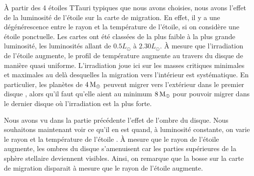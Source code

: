 À partir des 4 étoiles TTauri typiques que nous avons choisies, nous avons l'effet de la luminosité de l'étoile sur la carte de migration. En effet, il y a une dégénérescence entre le rayon et la température de l'étoile, si on considère une étoile ponctuelle. Les cartes ont été classées de la plus faible à la plus grande luminosité, les luminosités allant de $0.5\unit{L_\odot}$ à $2.30\unit{L_\odot}$. À mesure que l'irradiation de l'étoile augmente, le profil de température augmente au travers du disque de manière quasi uniforme. L'irradiation joue ici sur les masses critiques minimales et maximales au delà desquelles la migration vers l'intérieur est systématique. En particulier, les planètes de $4\mathrm{\thinspace M_\oplus}$ peuvent migrer vers l'extérieur dans le premier disque , alors qu'il faut qu'elle aient au minimum $8\mathrm{\thinspace M_\oplus}$ pour pouvoir migrer dans le dernier disque  où l'irradiation est la plus forte. 

\bigskip

Nous avons vu dans la partie précédente l'effet de l'ombre du disque. Nous souhaitons maintenant voir ce qu'il en est quand, à
luminosité constante, on varie le rayon et la température de l'étoile . À mesure que le rayon de
l'étoile augmente, les ombres du disque s'amenuisent car les parties supérieures de la sphère stellaire deviennent visibles.
Ainsi, on remarque que la bosse sur la carte de migration disparait à mesure que le rayon de l'étoile augmente. 

